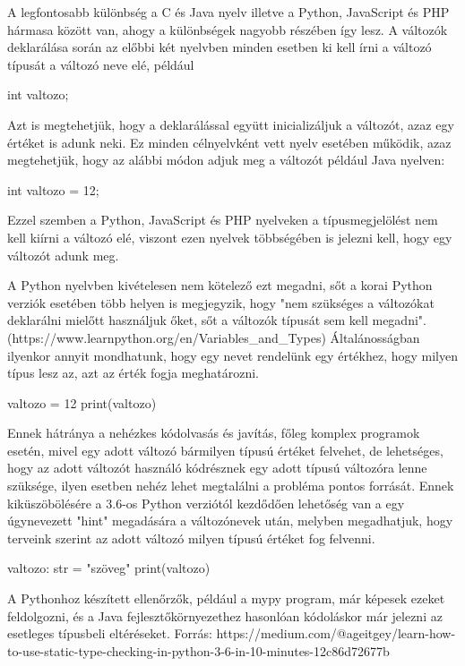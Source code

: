A legfontosabb különbség a C és Java nyelv illetve a Python, JavaScript és PHP hármasa között van, ahogy a különbségek nagyobb részében így lesz. A változók deklarálása során az előbbi két nyelvben minden esetben ki kell írni a változó típusát a változó neve elé, például
\begin{cpp}
	int valtozo;
\end{cpp}

Azt is megtehetjük, hogy a deklarálással együtt inicializáljuk a változót, azaz egy értéket is adunk neki. Ez minden célnyelvként vett nyelv esetében működik, azaz megtehetjük, hogy az alábbi módon adjuk meg a változót például Java nyelven:

\begin{cpp}
	int valtozo = 12;
\end{cpp}

Ezzel szemben a Python, JavaScript és PHP nyelveken a típusmegjelölést nem kell kiírni a változó elé, viszont ezen nyelvek többségében is jelezni kell, hogy egy változót adunk meg.

A Python nyelvben kivételesen nem kötelező ezt megadni, sőt a korai Python verziók esetében több helyen is megjegyzik, hogy "nem szükséges a változókat deklarálni mielőtt használjuk őket, sőt a változók típusát sem kell megadni". (https://www.learnpython.org/en/Variables\_and\_Types)
Általánosságban ilyenkor annyit mondhatunk, hogy egy nevet rendelünk egy értékhez, hogy milyen típus lesz az, azt az érték fogja meghatározni.

\begin{cpp}
	valtozo = 12
	print(valtozo)
\end{cpp}

Ennek hátránya a nehézkes kódolvasás és javítás, főleg komplex programok esetén, mivel egy adott változó bármilyen típusú értéket felvehet, de lehetséges, hogy az adott változót használó kódrésznek egy adott típusú változóra lenne szüksége, ilyen esetben nehéz lehet megtalálni a probléma pontos forrását. Ennek kiküszöbölésére a 3.6-os Python verziótól kezdődően lehetőség van a egy úgynevezett "hint" megadására a változónevek után, melyben megadhatjuk, hogy terveink szerint az adott változó milyen típusú értéket fog felvenni.

\begin{cpp}
	valtozo: str = "szöveg"
	print(valtozo)
\end{cpp}

A Pythonhoz készített ellenőrzők, például a mypy program, már képesek ezeket feldolgozni, és a Java fejlesztőkörnyezethez hasonlóan kódoláskor már jelezni az esetleges típusbeli eltéréseket. Forrás: https://medium.com/@ageitgey/learn-how-to-use-static-type-checking-in-python-3-6-in-10-minutes-12c86d72677b

